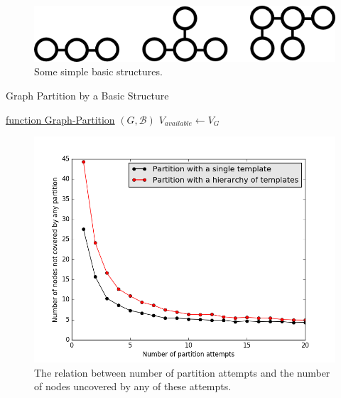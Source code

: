 \documentclass[11pt, titlepage]{article}
\theoremstyle{definition}
\begin{document}
\begin{figure}[!htb]
    \centering
    \captionsetup{width=.8\linewidth}
    \includegraphics[scale=0.5]{images/example_basics.png}
    \caption{Some simple basic structures.}
    \label{fig:basic_struct}
\end{figure}

\begin{algorithm}
    \caption{Graph Partition by a Basic Structure}
    \label{alg:part_graph}

    \underline{function Graph-Partition} $(G, \mathcal{B})$\;
    $V_{available}\gets V_G$\;
\end{algorithm}

\begin{figure}[!htb]
    \centering
    \captionsetup{width=.8\linewidth}
    \includegraphics[scale=0.5]{images/partition_loss.png}
    \caption{The relation between number of partition attempts and the number of nodes uncovered by any of these attempts.}
    \label{fig:part_drop}
\end{figure}
\end{document}
